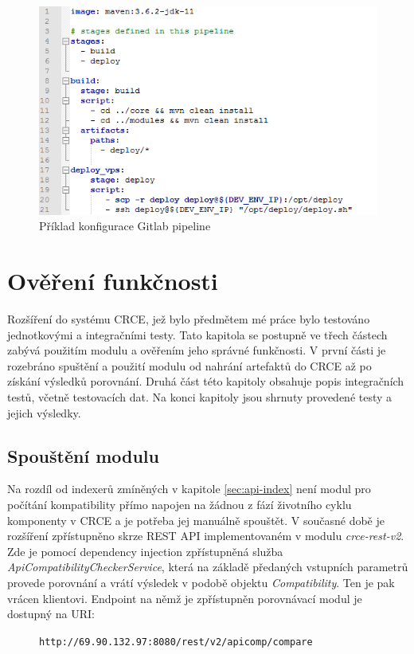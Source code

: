 \documentclass[czech,DP]{thesiskiv}
\begin{document}
\begin{figure}
	\centering
	\includegraphics[width=\linewidth]{pipeline-example}
	\caption{Příklad konfigurace Gitlab pipeline}
	\label{fig:pipeline-example}
\end{figure}

\chapter{Ověření funkčnosti}
\label{sec:testing}

Rozšíření do systému CRCE, jež bylo předmětem mé práce bylo testováno jednotkovými a integračními testy. Tato kapitola se postupně ve třech částech zabývá použitím modulu a ověřením jeho správné funkčnosti. V první části je rozebráno spuštění a použití modulu od nahrání artefaktů do CRCE až po získání výsledků porovnání. Druhá část této kapitoly obsahuje popis integračních testů, včetně testovacích dat. Na konci kapitoly jsou shrnuty provedené testy a jejich výsledky.

\section{Spouštění modulu}

Na rozdíl od indexerů zmíněných v kapitole \ref{sec:api-index} není modul pro počítání kompatibility přímo napojen na žádnou z fází životního cyklu komponenty v CRCE a je potřeba jej manuálně spouštět. V současné době je rozšíření zpřístupněno skrze REST API implementovaném v modulu \textit{crce-rest-v2}. Zde je pomocí dependency injection zpřístupněná služba \textit{ApiCompatibilityCheckerService}, která na základě předaných vstupních parametrů provede porovnání a vrátí výsledek v podobě objektu \textit{Compatibility}. Ten je pak vrácen klientovi. Endpoint na němž je zpřístupněn porovnávací modul je dostupný na URI:
\begin{figure}[h]
\centering
\verb|http://69.90.132.97:8080/rest/v2/apicomp/compare|
\end{figure}
\end{document}
